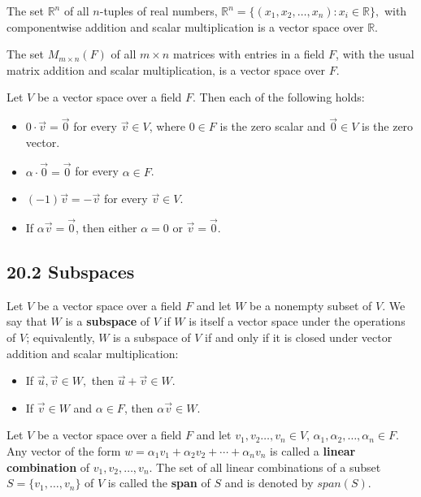\documentclass{article}
\newcommand{\R}{\mathbb{R}}
\begin{document}
\begin{example}
  The set $\R^n$ of all $n$-tuples of real numbers, $\R^n=\{(x_1,x_2,\dots,x_n):x_i\in\R\},$ with componentwise addition and scalar multiplication is a vector space over $\R$.
\end{example}

\begin{example}
  The set $M_{m\times n}(F)$ of all $m\times n$ matrices with entries in a field $F$, with the usual matrix addition and scalar multiplication, is a vector space over $F$.
\end{example}

\begin{theorem}
  Let $V$ be a vector space over a field $F$. Then each of the following holds:
  \begin{itemize}
    \item $0\cdot\vec{v}=\vec{0}$ for every $\vec{v}\in V$, where $0\in F$ is the zero scalar and $\vec{0}\in V$ is the zero vector.
    \item $\alpha\cdot\vec{0}=\vec{0}$ for every $\alpha\in F$.
    \item $(-1)\vec{v}=-\vec{v}$ for every $\vec{v}\in V$.
    \item If $\alpha\vec{v}=\vec{0}$, then either $\alpha=0$ or $\vec{v}=\vec{0}$.
  \end{itemize}
\end{theorem}

\subsection{20.2 Subspaces}
\begin{definition}
  Let $V$ be a vector space over a field $F$ and let $W$ be a nonempty subset of $V$. We say that $W$ is a \textbf{subspace} of $V$ if $W$ is itself a vector space under the operations of $V$; equivalently, $W$ is a subspace of $V$ if and only if it is closed under vector addition and scalar multiplication:
  \begin{itemize}
    \item If $\vec{u},\vec{v}\in W,$ then $\vec{u}+\vec{v}\in W$.
    \item If $\vec{v}\in W$ and $\alpha\in F$, then $\alpha\vec{v}\in W$.
  \end{itemize}
\end{definition}

\begin{definition}
  Let $V$ be a vector space over a field $F$ and let $v_1,v_2\dots,v_n\in V$, $\alpha_1,\alpha_2,\dots,\alpha_n\in F$. Any vector of the form $w=\alpha_1v_1+\alpha_2v_2+\cdots+\alpha_nv_n$ is called a \textbf{linear combination} of $v_1,v_2,\dots,v_n$. The set of all linear combinations of a subset $S=\{v_1,\dots,v_n\}$ of $V$ is called the \textbf{span} of $S$ and is denoted by $span(S)$.
\end{definition}
\end{document}
